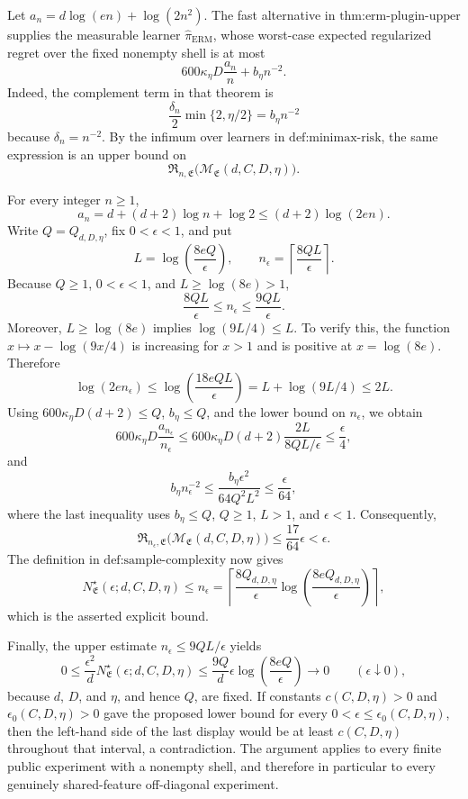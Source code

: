 Let \(a_n=d\log(en)+\log(2n^2)\). The fast alternative in \(\text{thm:erm-plugin-upper}\) supplies the measurable learner \(\widehat\pi_{\mathrm{ERM}}\), whose worst-case expected regularized regret over the fixed nonempty shell is at most
\[
600\kappa_\eta D\frac{a_n}{n}+b_\eta n^{-2}.
\]
Indeed, the complement term in that theorem is
\[
\frac{\delta_n}{2}\min\{2,\eta/2\}=b_\eta n^{-2}
\]
because \(\delta_n=n^{-2}\). By the infimum over learners in \(\text{def:minimax-risk}\), the same expression is an upper bound on
\[
\mathfrak R_{n,\mathfrak E}\bigl(\mathcal M_{\mathfrak E}(d,C,D,\eta)\bigr).
\]

For every integer \(n\ge1\),
\[
a_n=d+(d+2)\log n+\log2
\le(d+2)\log(2en).
\]
Write \(Q=Q_{d,D,\eta}\), fix \(0<\epsilon<1\), and put
\[
L=\log\!\left(\frac{8eQ}{\epsilon}\right),
\qquad
n_\epsilon=\left\lceil\frac{8QL}{\epsilon}\right\rceil.
\]
Because \(Q\ge1\), \(0<\epsilon<1\), and \(L\ge\log(8e)>1\),
\[
\frac{8QL}{\epsilon}\le n_\epsilon\le\frac{9QL}{\epsilon}.
\]
Moreover, \(L\ge\log(8e)\) implies \(\log(9L/4)\le L\). To verify this, the function \(x\mapsto x-\log(9x/4)\) is increasing for \(x>1\) and is positive at \(x=\log(8e)\). Therefore
\[
\log(2en_\epsilon)
\le\log\!\left(\frac{18eQL}{\epsilon}\right)
=L+\log(9L/4)
\le2L.
\]
Using \(600\kappa_\eta D(d+2)\le Q\), \(b_\eta\le Q\), and the lower bound on \(n_\epsilon\), we obtain
\[
600\kappa_\eta D\frac{a_{n_\epsilon}}{n_\epsilon}
\le
600\kappa_\eta D(d+2)\frac{2L}{8QL/\epsilon}
\le\frac\epsilon4,
\]
and
\[
b_\eta n_\epsilon^{-2}
\le\frac{b_\eta\epsilon^2}{64Q^2L^2}
\le\frac\epsilon{64},
\]
where the last inequality uses \(b_\eta\le Q\), \(Q\ge1\), \(L>1\), and \(\epsilon<1\). Consequently,
\[
\mathfrak R_{n_\epsilon,\mathfrak E}
\bigl(\mathcal M_{\mathfrak E}(d,C,D,\eta)\bigr)
\le\frac{17}{64}\epsilon<\epsilon.
\]
The definition in \(\text{def:sample-complexity}\) now gives
\[
N^\star_{\mathfrak E}(\epsilon;d,C,D,\eta)
\le n_\epsilon
=
\left\lceil\frac{8Q_{d,D,\eta}}{\epsilon}
\log\!\left(\frac{8eQ_{d,D,\eta}}{\epsilon}\right)\right\rceil,
\]
which is the asserted explicit bound.

Finally, the upper estimate \(n_\epsilon\le9QL/\epsilon\) yields
\[
0\le
\frac{\epsilon^2}{d}N^\star_{\mathfrak E}(\epsilon;d,C,D,\eta)
\le\frac{9Q}{d}\epsilon
\log\!\left(\frac{8eQ}{\epsilon}\right)
\longrightarrow0
\qquad(\epsilon\downarrow0),
\]
because \(d\), \(D\), and \(\eta\), and hence \(Q\), are fixed. If constants \(c(C,D,\eta)>0\) and \(\epsilon_0(C,D,\eta)>0\) gave the proposed lower bound for every \(0<\epsilon\le\epsilon_0(C,D,\eta)\), then the left-hand side of the last display would be at least \(c(C,D,\eta)\) throughout that interval, a contradiction. The argument applies to every finite public experiment with a nonempty shell, and therefore in particular to every genuinely shared-feature off-diagonal experiment.